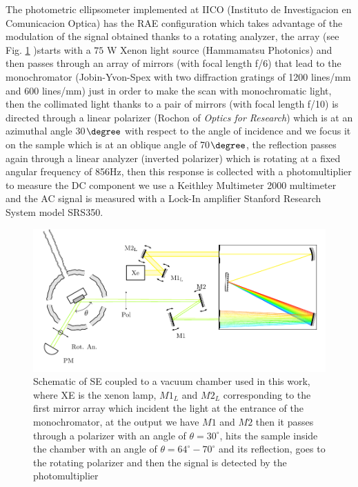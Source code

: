 The photometric ellipsometer implemented at IICO (Instituto de Investigacion en Comunicacion Optica) has the RAE configuration which takes advantage of the modulation of the signal obtained thanks to a rotating analyzer, the array (see Fig. \ref*{fig:SE-SETUP-FINE} )starts with a $75$ W Xenon light source (Hammamatsu Photonics) and then passes through an array of mirrors (with focal length f/6) that lead to the monochromator (Jobin-Yvon-Spex with two diffraction gratings of 1200 lines/mm and 600 lines/mm) just in order to make the scan with monochromatic light,  then the collimated light thanks to a pair of mirrors (with focal length f/10) is directed through a linear polarizer (Rochon of \textit{Optics for Research}) which is at an azimuthal angle 30$\degree$ with respect to the angle of incidence and we focus it on the sample which is at an oblique angle of 70$\degree$, the reflection passes again through a linear analyzer (inverted polarizer) which is rotating at a fixed angular frequency of 856Hz, then this response is collected with a photomultiplier to measure the DC component we use a Keithley Multimeter 2000 multimeter and the AC signal is measured with a Lock-In amplifier Stanford Research System model SRS350.

\begin{figure}[H]
	\centering
	\includegraphics[width=0.85\linewidth]{FIGURES/Characterization_techniques/SE-SETUP-FINE}
	\caption{Schematic of SE coupled to a vacuum chamber used in this work, where XE is the xenon lamp, $M1_{L}$ and $M2_{L}$ corresponding to the first mirror array which incident the light at the entrance of the monochromator, at the output we have $M1$ and $M2$ then it passes through a polarizer with an angle of $\theta=30^{\circ}$, hits the sample inside the chamber with an angle of $\theta=64^{\circ}-70^{\circ}$ and its reflection, goes to the rotating polarizer and then the signal is detected by the photomultiplier}
	\label{fig:SE-SETUP-FINE}
\end{figure}

